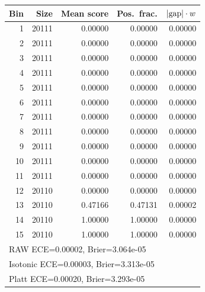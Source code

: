 \begin{tabular}{rrrrr}
\toprule
Bin & Size & Mean score & Pos.\ frac. & $|{\rm gap}|\cdot w$\\
\midrule
1 & 20111 & 0.00000 & 0.00000 & 0.00000\\
2 & 20111 & 0.00000 & 0.00000 & 0.00000\\
3 & 20111 & 0.00000 & 0.00000 & 0.00000\\
4 & 20111 & 0.00000 & 0.00000 & 0.00000\\
5 & 20111 & 0.00000 & 0.00000 & 0.00000\\
6 & 20111 & 0.00000 & 0.00000 & 0.00000\\
7 & 20111 & 0.00000 & 0.00000 & 0.00000\\
8 & 20111 & 0.00000 & 0.00000 & 0.00000\\
9 & 20111 & 0.00000 & 0.00000 & 0.00000\\
10 & 20111 & 0.00000 & 0.00000 & 0.00000\\
11 & 20111 & 0.00000 & 0.00000 & 0.00000\\
12 & 20110 & 0.00000 & 0.00000 & 0.00000\\
13 & 20110 & 0.47166 & 0.47131 & 0.00002\\
14 & 20110 & 1.00000 & 1.00000 & 0.00000\\
15 & 20110 & 1.00000 & 1.00000 & 0.00000\\
\midrule
\multicolumn{5}{l}{RAW ECE=0.00002, Brier=3.064e-05}\\
\multicolumn{5}{l}{Isotonic ECE=0.00003, Brier=3.313e-05}\\
\multicolumn{5}{l}{Platt ECE=0.00020, Brier=3.293e-05}\\
\bottomrule
\end{tabular}
